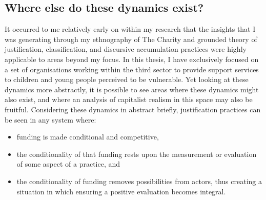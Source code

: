 \subsection{Where else do these dynamics exist?}
It occurred to me relatively early on within my research that the insights that I was generating through my ethnography of The Charity and grounded theory of justification, classification, and discursive accumulation practices were highly applicable to areas beyond my focus. In this thesis, I have exclusively focused on a set of organisations working within the third sector to provide support services to children and young people perceived to be vulnerable. Yet looking at these dynamics more abstractly, it is possible to see areas where these dynamics might also exist, and where an analysis of capitalist realism in this space may also be fruitful. Considering these dynamics in abstract briefly, justification practices can be seen in any system where: 
\begin{itemize}
    \item funding is made conditional and competitive,
    \item the conditionality of that funding rests upon the measurement or evaluation of some aspect of a practice, and
    \item the conditionality of funding removes possibilities from actors, thus creating a situation in which ensuring a positive evaluation becomes integral. 
\end{itemize}
